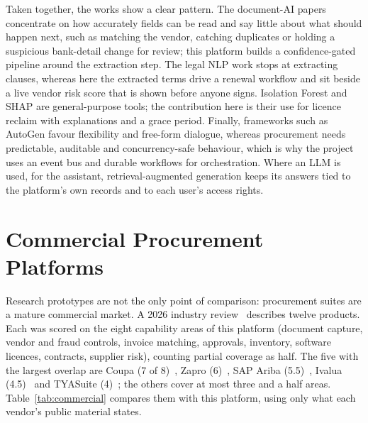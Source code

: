 Taken together, the works show a clear pattern. The document-AI papers concentrate on how accurately fields can be read and say little about what should happen next, such as matching the vendor, catching duplicates or holding a suspicious bank-detail change for review; this platform builds a confidence-gated pipeline around the extraction step. The legal NLP work stops at extracting clauses, whereas here the extracted terms drive a renewal workflow and sit beside a live vendor risk score that is shown before anyone signs. Isolation Forest and SHAP are general-purpose tools; the contribution here is their use for licence reclaim with explanations and a grace period. Finally, frameworks such as AutoGen favour flexibility and free-form dialogue, whereas procurement needs predictable, auditable and concurrency-safe behaviour, which is why the project uses an event bus and durable workflows for orchestration. Where an LLM is used, for the assistant, retrieval-augmented generation keeps its answers tied to the platform's own records and to each user's access rights.

\section{Commercial Procurement Platforms}\label{sec:commercial}
Research prototypes are not the only point of comparison: procurement suites are a mature commercial market. A 2026 industry review~\cite{scry2026best} describes twelve products. Each was scored on the eight capability areas of this platform (document capture, vendor and fraud controls, invoice matching, approvals, inventory, software licences, contracts, supplier risk), counting partial coverage as half. The five with the largest overlap are Coupa (7 of 8)~\cite{coupa2026release}, Zapro (6)~\cite{zapro2026}, SAP Ariba (5.5)~\cite{sap2026ariba}, Ivalua (4.5)~\cite{scry2026best} and TYASuite (4)~\cite{tyasuite2026}; the others cover at most three and a half areas. Table~\ref{tab:commercial} compares them with this platform, using only what each vendor's public material states.

